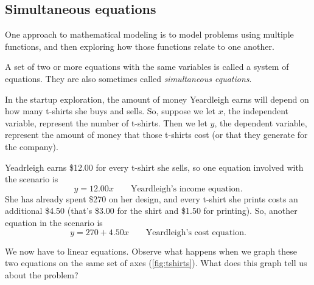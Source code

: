 \subsection{Simultaneous equations}

One approach to mathematical modeling is to model problems using multiple functions, and then exploring how those functions relate to one another. 

\begin{boxeddef}
A set of two or more equations with the same variables is called a \gls{system of equations}. They are also sometimes called \textit{simultaneous equations}.
\end{boxeddef}



In the startup exploration, the amount of money Yeardleigh earns will depend on how many t-shirts she buys and sells. So, suppose we let $x$, the independent variable, represent the number of t-shirts. Then we let $y$, the dependent variable, represent the amount of money that those t-shirts cost (or that they generate for the company).

Yeadrleigh earns \$12.00 for every t-shirt she sells, so one equation involved with the scenario is \[y = 12.00x \qquad\text{Yeardleigh's income equation}.\] She has already spent \$270 on her design, and every t-shirt she prints costs an additional \$4.50 (that's \$3.00 for the shirt and \$1.50 for printing). So, another equation in the scenario is \[y = 270 + 4.50x\qquad\text{Yeardleigh's cost equation}.\]

We now have to linear equations. Observe what happens when we graph these two equations on the same set of axes (\cref{fig:tshirts}). What does this graph tell us about the problem?

